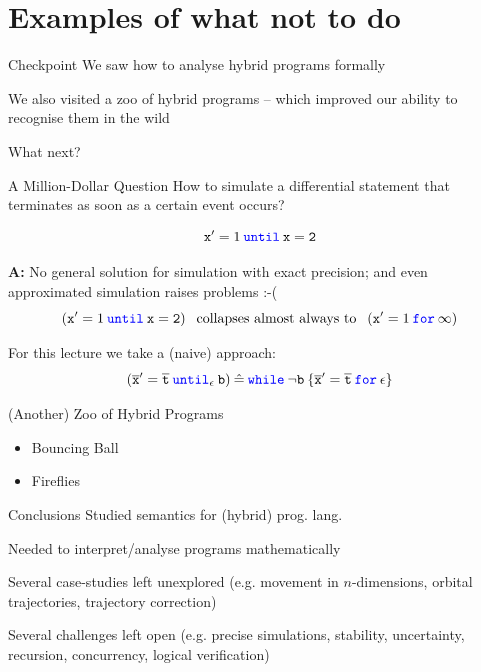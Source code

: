 \documentclass{beamer}
\newcommand{\blue}[1]{\textcolor{blue}{#1}}
\begin{document}
\section{Examples of what not to do}

\begin{frame}{Checkpoint}
        We saw how to \alert{analyse} hybrid programs \alert{formally}

        We also visited a zoo of hybrid programs -- which improved our 
        ability to recognise them in the wild

        \pause
        What next?
\end{frame}


\begin{frame}{A Million-Dollar Question}
        How to simulate a differential statement that \alert{terminates
        as soon as} a certain \alert{event} occurs?  

        \[
                \mathtt{x}' = 1 \> \mathtt{\blue{until}} \> \mathtt{x = 2}
        \]

        \textbf{A:} No general solution for simulation with \alert{exact
        precision}; and even approximated simulation raises problems :-( 
        \[
                (\mathtt{x}' = 1 \> \mathtt{\blue{until}} \> \mathtt{x = 2}) \> \>
                \text{ collapses almost always to } \> \>
                (\mathtt{x}' = 1 \> \mathtt{\blue{for}} \> \mathtt{\infty})
        \]

        \vfill
        \pause
        For this lecture we take a (naive) approach:
        \[
                (\overline{\mathtt{x}}' = \overline{\mathtt{t}} \>
                \blue{\mathtt{until}}_\epsilon \> \mathtt{b}) \> \hat = \>
                \blue{\mathtt{while}} \> \neg \mathtt{b} \> \{ \overline{\mathtt{x}}' 
                = \overline{\mathtt{t}} \> \blue{\mathtt{for}} \> \epsilon \} 
        \]
        \end{frame}
\begin{frame}{(Another) Zoo of Hybrid Programs}
        \begin{itemize}
                \item Bouncing Ball
                \item Fireflies
        \end{itemize}

\end{frame}

\begin{frame}{Conclusions}
        Studied \alert{semantics} for (hybrid) prog. lang.

        Needed to interpret/analyse programs \alert{mathematically}

        Several case-studies left unexplored (e.g. movement in $n$-dimensions,
                orbital trajectories, trajectory correction)

        Several challenges left open (e.g. precise simulations, stability,
        uncertainty, recursion, concurrency, logical verification)
\end{frame}
\end{document}
